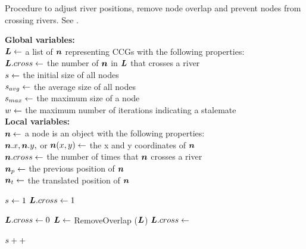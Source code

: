 \begin{algorithm}[tb!]
    \caption{Procedure to adjust river positions, remove node overlap and prevent nodes from crossing rivers. See .}\label{alg:UpdateLayout}
    \textbf{Global variables:} \\
    $ \bm{L} \gets $ a list of $ \bm{n} $ representing CCGs with the following properties: \\
    \-\hspace{1em}  $\bm{L}.cross \gets $ the number of $ \bm{n} $ in $ \bm{L} $ that crosses a river \\

    $ s \gets $ the initial size of all nodes \\
    $ s_{avg} \gets $ the average size of all nodes \\
    $ s_{max} \gets $ the maximum size of a node \\
    $ w \gets $ the maximum number of iterations indicating a stalemate \\

    \textbf{Local variables:} \\
    $ \bm{n} \gets $ a node is an object with the following properties: \\
    \-\hspace{1em} $ \bm{n}.x, \bm{n}.y, $ or $ \bm{n}(x,y) \gets $ the x and y coordinates of $ \bm{n} $ \\
    \-\hspace{1em} $ \bm{n}.cross \gets $ the number of times that $ \bm{n} $ crosses a river \\
    \-\hspace{1em} $ \bm{n}_{p} \gets $ the previous position of $ \bm{n} $ \\
    \-\hspace{1em} $ \bm{n}_t \gets $ the translated position of $ \bm{n} $ \\

    \begin{algorithmic}[1]

        \State $ s \gets 1 $
        \While{$ \nodeSizeAvg < \nodeSizeMax $}
        \State $ \bm{L}.cross \gets 1 $ 

        \State $ \bm{L}.cross \gets 0 $
        \State $ \bm{L} \gets $ RemoveOverlap ($ \bm{L} $)
        \State {}
        \State $\bm{L}.cross \gets $ 

        \EndWhile

        \State $ s ++ $

        \EndWhile

        \EndProcedure
    \end{algorithmic}
\end{algorithm}


